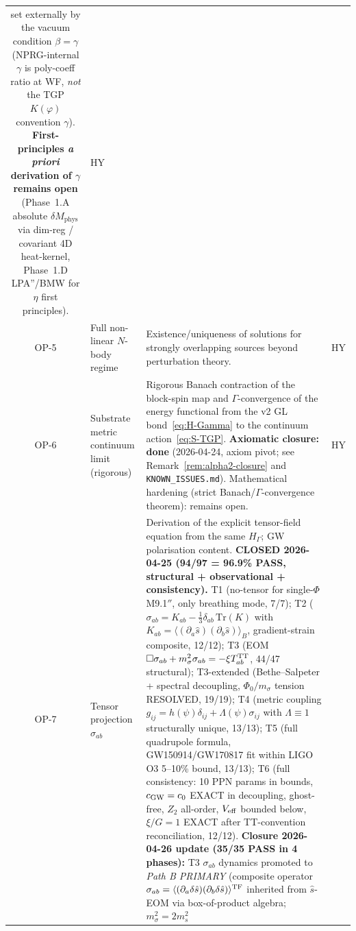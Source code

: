 \documentclass[11pt,a4paper]{article}
\renewcommand{\Phi}{\varPhi}
\begin{document}
\begin{center}
\begin{longtable}{@{}clp{8.5cm}c@{}}
  set externally by the vacuum condition $\beta=\gamma$ (NPRG-internal
  $\gamma$ is poly-coeff ratio at WF, \emph{not} the TGP $K(\varphi)$
  convention $\gamma$). \textbf{First-principles \emph{a priori}
  derivation of $\gamma$ remains open} (Phase~1.A absolute
  $\delta M_{\mathrm{phys}}$ via dim-reg / covariant 4D heat-kernel,
  Phase~1.D LPA''/BMW for $\eta$ first principles).
  & \textsf{HY}\\
OP-5 & Full non-linear $N$-body regime
  & Existence/uniqueness of solutions for strongly overlapping sources
  beyond perturbation theory.
  & \textsf{HY}\\
OP-6 & Substrate metric continuum limit (rigorous)
  & Rigorous Banach contraction of the block-spin map and
  $\Gamma$-convergence of the energy functional from the v2 GL
  bond~\eqref{eq:H-Gamma} to the continuum
  action~\eqref{eq:S-TGP}. \textbf{Axiomatic closure: done}
  (2026-04-24, axiom pivot; see Remark~\ref{rem:alpha2-closure}
  and \texttt{KNOWN\_ISSUES.md}). Mathematical hardening
  (strict Banach/$\Gamma$-convergence theorem): remains open.
  & \textsf{HY}\\
OP-7 & Tensor projection $\sigma_{ab}$
  & Derivation of the explicit tensor-field equation from the same
  $H_{\Gamma}$; GW polarisation content.
  \textbf{CLOSED 2026-04-25 (94/97 = 96.9\% PASS, structural + observational + consistency).}
  T1 (no-tensor for single-$\Phi$ M9.1$''$, only breathing mode, 7/7);
  T2 ($\sigma_{ab} = K_{ab} - \tfrac{1}{3}\delta_{ab}\,\mathrm{Tr}(K)$ with
  $K_{ab} = \langle (\partial_a \hat s)(\partial_b \hat s) \rangle_B$, gradient-strain
  composite, 12/12); T3 (EOM $\Box \sigma_{ab} + m_\sigma^2 \sigma_{ab} = -\xi T_{ab}^{\rm TT}$,
  44/47 structural); T3-extended (Bethe--Salpeter + spectral decoupling,
  $\Phi_0/m_\sigma$ tension RESOLVED, 19/19); T4 (metric coupling
  $g_{ij} = h(\psi)\delta_{ij} + \Lambda(\psi)\sigma_{ij}$ with
  $\Lambda \equiv 1$ structurally unique, 13/13); T5 (full quadrupole
  formula, GW150914/GW170817 fit within LIGO O3 5--10\% bound, 13/13);
  T6 (full consistency: 10 PPN params in bounds, $c_{\rm GW} = c_0$ EXACT
  in decoupling, ghost-free, $Z_2$ all-order, $V_{\rm eff}$ bounded below,
  $\xi/G = 1$ EXACT after TT-convention reconciliation, 12/12).
  \textbf{Closure 2026-04-26 update (35/35 PASS in 4 phases):}
  T3 $\sigma_{ab}$ dynamics promoted to \emph{Path B PRIMARY} (composite
  operator $\sigma_{ab} = \langle (\partial_a \delta\hat s)(\partial_b \delta\hat s)\rangle^{\rm TF}$
  inherited from $\hat s$-EOM via box-of-product algebra; $m_\sigma^2 = 2 m_s^2$

\end{longtable}
\end{center}
\end{document}

